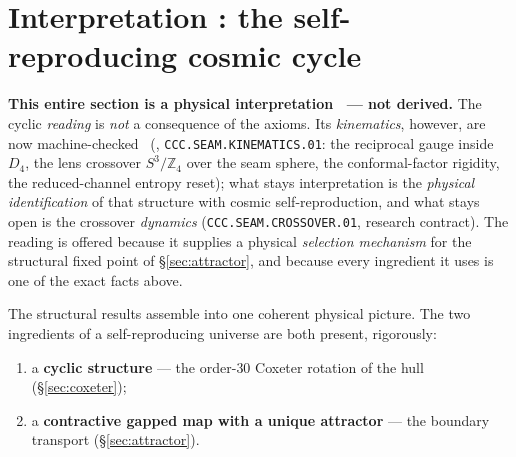 \documentclass[11pt,a4paper]{article}
\newcommand{\Z}{\mathbb Z}
\begin{document}
\section{Interpretation \mC: the self-reproducing cosmic cycle}\label{sec:cycle}
\par\smallskip\noindent\textbf{This entire section is a physical interpretation \mC\ --- not derived.}
The cyclic \emph{reading} is \emph{not} a consequence of the axioms.  Its \emph{kinematics}, however, are
now machine-checked \mE\ (, \texttt{CCC.SEAM.KINEMATICS.01}:
the reciprocal gauge inside $D_4$, the lens crossover $S^3/\Z_4$ over the seam sphere, the
conformal-factor rigidity, the reduced-channel entropy reset); what stays interpretation is the
\emph{physical identification} of that structure with cosmic self-reproduction, and what stays open is
the crossover \emph{dynamics} (\texttt{CCC.SEAM.CROSSOVER.01}, research contract).  The reading is
offered because it supplies a physical \emph{selection mechanism} for the structural fixed point of
\S\ref{sec:attractor}, and because every ingredient it uses is one of the exact facts above.
\par\smallskip

\noindent The structural results assemble into one coherent physical picture. The two ingredients of a
self-reproducing universe are both present, rigorously:
\begin{enumerate}[leftmargin=1.6em]
\item a \textbf{cyclic structure} --- the order-$30$ Coxeter rotation of the hull (\S\ref{sec:coxeter});
\item a \textbf{contractive gapped map with a unique attractor} --- the boundary transport (\S\ref{sec:attractor}).
\end{enumerate}
\end{document}
